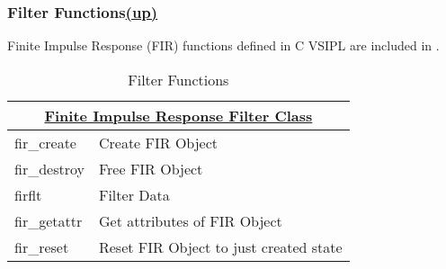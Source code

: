 \subsubsection*{Filter Functions\hspace*{\fill}\hyperlink{SignalProcessing}{(up)}\hypertarget{filterFunctions}{}} 
Finite Impulse Response (FIR) functions defined in C VSIPL are included in \pyjv. 
\begin{table}[H]
\caption{Filter Functions}
\label{tab:filterFunctions}
\begin{center}
\begin{tabular}{|l|l|}
\multicolumn{2}{c}{\hyperlink{firFunc}{\rmfamily \bfseries Finite Impulse Response Filter Class}} \\ \hline
fir\_create & Create FIR Object\\
fir\_destroy & Free FIR Object\\
firflt & Filter Data\\
fir\_getattr & Get attributes of FIR Object\\
fir\_reset & Reset FIR Object to just created state\\ \hline
\end{tabular}
\end{center}
\end{table}%